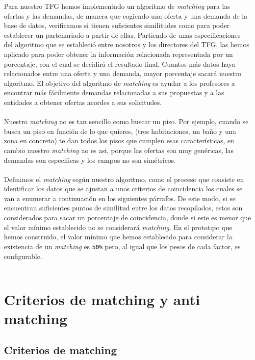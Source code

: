 \documentclass[11pt]{book}
\begin{document}
Para nuestro TFG hemos implementado un algoritmo de \emph{matching} para las ofertas y las demandas, de manera que cogiendo una oferta y una demanda de la base de datos, verificamos si tienen suficientes similitudes como para poder establecer un partenariado a partir de ellas. Partiendo de unas especificaciones del algoritmo que se estableció entre nosotros y los directores del TFG, las hemos aplicado para poder obtener la información relacionada representada por un porcentaje, con el cual se decidirá el resultado final.  Cuantos más datos haya relacionados entre una oferta y una demanda, mayor porcentaje sacará nuestro algoritmo. El objetivo del algoritmo de \emph{matching} es ayudar a los profesores a encontrar más fácilmente demandas relacionadas a sus propuestas y a las entidades a obtener ofertas acordes a sus solicitudes. \\\\
Nuestro \emph{matching} no es tan sencillo como buscar un piso. Por ejemplo, cuando se busca un piso en función de lo que quieres, (tres habitaciones, un baño y una zona en concreto) te dan todos los pisos que cumplen esas características, en cambio nuestro \emph{matching} no es asi, porque las ofertas son muy genéricas, las demandas son especificas y los campos no son simétricos.\\\\
Definimos el \emph{matching} según nuestro algoritmo, como el proceso que consiste en identificar los datos que se ajustan a unos criterios de coincidencia los cuales se van a enumerar a continuación en los siguientes párrafos. De este modo, si se encuentran suficientes puntos de similitud entre los datos recopilados, estos son considerados para sacar un porcentaje de coincidencia, donde si este es menor que el valor mínimo establecido no se considerará \emph{matching}. En el prototipo que hemos construido, el valor mínimo que hemos
establecido para considerar la existencia de un \emph{matching} es \texttt{50\%} pero, al
igual que los pesos de cada factor, es configurable.
\\\\

\section{Criterios de matching y anti matching}
\subsection{Criterios de matching }
\end{document}

